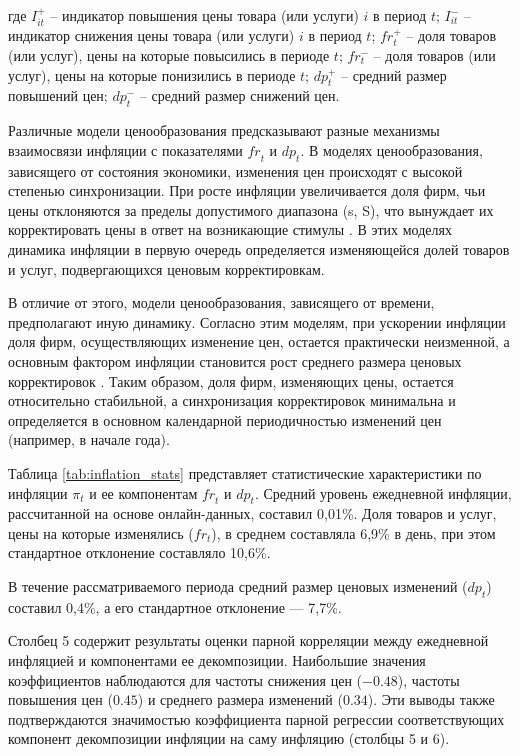 где \( I_{it}^+ \) – индикатор повышения цены товара (или услуги) \( i \) в период \( t \);  
\( I_{it}^- \) – индикатор снижения цены товара (или услуги) \( i \) в период \( t \);  
\( fr_t^+ \) – доля товаров (или услуг), цены на которые повысились в периоде \( t \);  
\( fr_t^- \) – доля товаров (или услуг), цены на которые понизились в периоде \( t \);  
\( dp_t^+ \) – средний размер повышений цен;  
\( dp_t^- \) – средний размер снижений цен.

Различные модели ценообразования предсказывают разные механизмы взаимосвязи инфляции с показателями $\mathit{fr}_t$ и $\mathit{dp}_t$. В моделях ценообразования, зависящего от состояния экономики, изменения цен происходят с высокой степенью синхронизации. При росте инфляции увеличивается доля фирм, чьи цены отклоняются за пределы допустимого диапазона (s, S), что вынуждает их корректировать цены в ответ на возникающие стимулы \cite{CaplinSpulber1987, golosov2007}. В этих моделях динамика инфляции в первую очередь определяется изменяющейся долей товаров и услуг, подвергающихся ценовым корректировкам.

В отличие от этого, модели ценообразования, зависящего от времени, предполагают иную динамику. Согласно этим моделям, при ускорении инфляции доля фирм, осуществляющих изменение цен, остается практически неизменной, а основным фактором инфляции становится рост среднего размера ценовых корректировок \cite{Taylor1980, Calvo1983}. Таким образом, доля фирм, изменяющих цены, остается относительно стабильной, а синхронизация корректировок минимальна и определяется в основном календарной периодичностью изменений цен (например, в начале года).

Таблица \ref{tab:inflation_stats} представляет статистические характеристики по инфляции $\pi_t$ и ее компонентам $\mathit{fr}_t$ и $\mathit{dp}_t$. Средний уровень ежедневной инфляции, рассчитанной на основе онлайн-данных, составил 0,01\%. Доля товаров и услуг, цены на которые изменялись (\( fr_t \)), в среднем составляла 6,9\% в день, при этом стандартное отклонение составляло 10,6\%.  

В течение рассматриваемого периода средний размер ценовых изменений (\( dp_t \)) составил 0,4\%, а его стандартное отклонение — 7,7\%.  

Столбец 5 содержит результаты оценки парной корреляции между ежедневной инфляцией и компонентами ее декомпозиции. Наибольшие значения коэффициентов наблюдаются для частоты снижения цен (\(-0.48\)), частоты повышения цен (\(0.45\)) и среднего размера изменений (\(0.34\)).  Эти выводы также подтверждаются значимостью коэффициента парной регрессии соответствующих компонент декомпозиции инфляции на саму инфляцию (столбцы 5 и 6).

